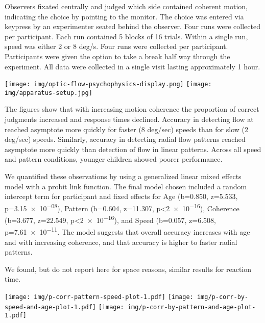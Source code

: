 \documentclass[landscape,final,paperwidth=60in,paperheight=39in,fontscale=0.285]{baposter}
\begin{document}
\begin{poster}
{\par Observers fixated centrally and judged which side contained coherent motion, indicating the choice by pointing to the monitor. The choice was entered via keypress by an experimenter seated behind the observer. Four runs were collected per participant. Each run contained 5 blocks of 16 trials. Within a single run, speed was either 2 or 8 deg/s. Four runs were collected per participant. Participants were given the option to take a break half way through the experiment. All data were collected in a single visit lasting approximately 1 hour.
    }
    {
\begin{center}
\texttt{[image: img/optic-flow-psychophysics-display.png]}
\texttt{[image: img/apparatus-setup.jpg]}
\end{center}
    }
    {
\par The figures show that with increasing motion coherence the proportion of correct judgments increased and response times declined. Accuracy in detecting flow at reached asymptote more quickly for faster (8 deg/sec) speeds than for slow (2 deg/sec) speeds. Similarly, accuracy in detecting radial flow patterns reached asymptote more quickly than detection of flow in linear patterns. Across all speed and pattern conditions, younger children showed poorer performance.
\par We quantified these observations by using a generalized linear mixed effects model with a probit link function. The final model chosen included a random intercept term for participant and fixed effects for Age (b=0.850, z=5.533, p=\num{3.15e-08}), Pattern (b=0.604, z=11.307, p<\num{2e-16}), Coherence (b=3.677, z=22.549, p<\num{2e-16}), and Speed (b=0.057, z=6.508, p=\num{7.61e-11}. The model suggests that overall accuracy increases with age and with increasing coherence, and that accuracy is higher to faster radial patterns. 
\par We found, but do not report here for space reasons, similar results for reaction time.
}

    {
 \begin{center}
 \texttt{[image: img/p-corr-pattern-speed-plot-1.pdf]}
 \texttt{[image: img/p-corr-by-speed-and-age-plot-1.pdf]}
 \texttt{[image: img/p-corr-by-pattern-and-age-plot-1.pdf]}
 \end{center}
}


\end{poster}
\end{document}
